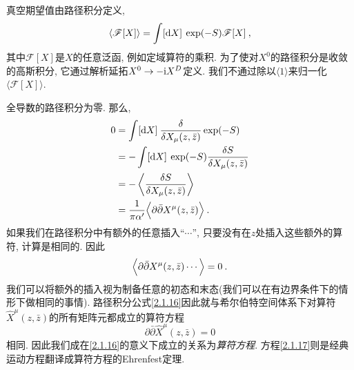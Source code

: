 真空期望值由路径积分定义,
\begin{equation}
\langle\mathscr{F}[X]\rangle=\int[\mathrm{d} X]\: \exp (-S) \mathscr{F}[X] \:,
\end{equation}
其中$\mathscr{F}[X]$是$X$的任意泛函, 例如定域算符的乘积. 为了使对$X^{0}$的路径积分是收敛的高斯积分, 它通过解析延拓$X^{0} \to -\mathrm{i} X^{D}$定义. 我们不通过除以$\langle 1\rangle$来归一化$\langle\mathscr{F}[X]\rangle$.

全导数的路径积分为零. 那么,
\begin{align}
0 &=\int[\mathrm{d} X]\: \frac{\delta}{\delta X_{\mu}(z, \bar{z})} \exp (-S) \nonumber \\
&=-\int[\mathrm{d} X]\: \exp (-S) \frac{\delta S}{\delta X_{\mu}(z, \bar{z})} \nonumber  \\
&=-\left\langle\frac{\delta S}{\delta X_{\mu}(z, \bar{z})}\right\rangle  \nonumber \\
&=\frac{1}{\pi \alpha^{\prime}}\Bigl\langle\partial \bar{\partial} X^{\mu}(z, \bar{z})\Bigr\rangle \:. \label{2.1.15}
\end{align}
如果我们在路径积分中有额外的任意插入“$\cdots$”, 只要没有在$z$处插入这些额外的算符, 计算是相同的. 因此
\begin{equation}
\Bigl\langle\partial \bar{\partial} X^{\mu}(z, \bar{z}) \cdots\Bigr\rangle=0 \:. \label{2.1.16}
\end{equation}
我们可以将额外的插入视为制备任意的初态和末态(我们可以在有边界条件下的情形下做相同的事情).
路径积分公式\eqref{2.1.16}因此就与希尔伯特空间体系下对算符$\hat{X}^{\mu}(z, \bar{z})$的所有矩阵元都成立的算符方程
\begin{equation}
\partial \bar{\partial} \hat{X}^{\mu}(z, \bar{z})=0 \label{2.1.17}
\end{equation}
相同. 因此我们成在\eqref{2.1.16}的意义下成立的关系为\emph{算符方程}. 方程\eqref{2.1.17}则是经典运动方程翻译成算符方程的Ehrenfest定理.

